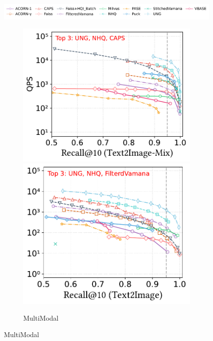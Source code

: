 \documentclass[sigconf, nonacm]{acmart}
\begin{document}
	
	
	\begin{figure}[t]
		\centering
		
		
		\hspace*{5pt}
		\includegraphics[width=0.98\columnwidth]{figures/exp/attribute_legend.pdf}
		
		\begin{subfigure}[t]{0.98\columnwidth}
		\centering
		\includegraphics[width=0.507\linewidth]{figures/exp/attribute_multimodel.pdf}
		\hfill %
		\includegraphics[width=0.48\linewidth]{figures/exp/attribute_multimodel_1.pdf}
	
		\captionsetup{font=small}
		\caption{MultiModal}
		\label{fig:MultiModal} %
		\end{subfigure}
		

\end{figure}
\end{document}
